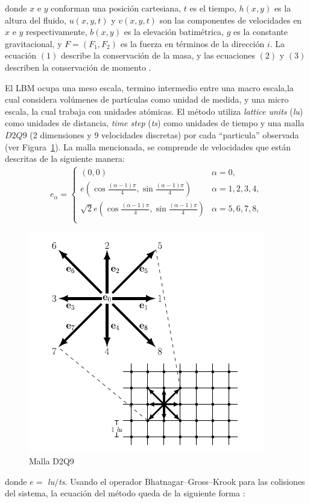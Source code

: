 donde \(x\) e \(y\) conforman una posición cartesiana, \(t\) es el tiempo, \(h(x,y)\) es la altura del fluido, \(u(x,y,t)\) y \(v(x,y,t)\) son las componentes de velocidades en \(x\) e \(y\) respectivamente, \(b(x,y)\) es la elevación batimétrica, \(g\) es la constante gravitacional, y $F = (F_1, F_2)$ es la fuerza en términos de la dirección \(i\). 
La ecuación \((1)\) describe la conservación de la masa, y las ecuaciones \((2)\) y \((3)\) describen la conservación de momento \cite{paperB}.

El LBM ocupa una meso escala, termino intermedio entre una macro escala,la cual considera volúmenes de partículas como unidad de medida, y una micro escala, la cual trabaja con unidades atómicas. 
El método utiliza \textit{lattice units} (\textit{lu}) como unidades de distancia, \textit{time step} (\textit{ts}) como unidades de tiempo y una malla \(D2Q9\) (2 dimensiones y 9 velocidades discretas) por cada ``particula'' observada (ver Figura~\ref{fig:14}). 
La malla mencionada, se comprende de velocidades que están descritas de la siguiente manera:
\begin{align*}
    e_\alpha = 
     \begin{cases}
       (0,0) & \alpha = 0,\\
       e \left(\cos\frac{(\alpha - 1)\pi}{4}, \sin\frac{(\alpha - 1)\pi}{4} \right) & \alpha = 1, 2, 3, 4, \\
       \sqrt{2} e \left(\cos\frac{(\alpha - 1)\pi}{4}, \sin\frac{(\alpha - 1)\pi}{4} \right) & \alpha = 5, 6, 7, 8,\\
     \end{cases}
\end{align*}  
\begin{figure}
    \centering
    \includegraphics[scale=0.7]{Figures/d2q9.png}
    \caption{Malla D2Q9}
    \label{fig:14}
\end{figure}
donde $e = $ \textit{lu}\(/\)\textit{ts}. 
Usando el operador Bhatnagar–Gross–Krook para las colisiones del sistema, la ecuación del método queda de la siguiente forma \cite{bgk}:

